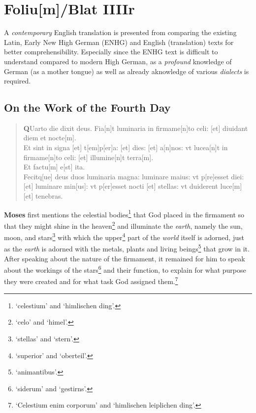 \documentclass[
]{article}
\author{Dietmar Gerald Schrausser}
\date{09.05.2026}
\begin{document}
\hypertarget{foliumblat-iiiir}{%
\section{Foliu{[}m{]}/Blat IIIIr}\label{foliumblat-iiiir}}

A \emph{contemporary} English translation is presented from comparing
the existing Latin, Early New High German (ENHG) and English
(translation) texts for better comprehensibility. Especially since the
ENHG text is difficult to understand compared to modern High German, as
a \emph{profound} knowledge of German (as a mother tongue) as well as
already aknowledge of various \emph{dialects} is required.

\hypertarget{on-the-work-of-the-fourth-day}{%
\subsection{On the Work of the Fourth
Day}\label{on-the-work-of-the-fourth-day}}

\begin{quote}
\textbf{Q}Uarto die dixit deus. Fia{[}n{]}t luminaria in
firmame{[}n{]}to celi: {[}et{]} diuidant diem et nocte{[}m{]}.\\
Et sint in signa {[}et{]} t{[}em{]}p{[}er{]}a: {[}et{]} dies: {[}et{]}
a{[}n{]}nos: vt lucea{[}n{]}t in firmame{[}n{]}to celi: {[}et{]}
illumine{[}n{]}t terra{[}m{]}.\\
Et factu{[}m{]} e{[}st{]} ita.\\
Fecitq{[}ue{]} deus duos luminaria magna: luminare maius: vt
p{[}re{]}esset diei: {[}et{]} luminare min{[}us{]}: vt p{[}er{]}esset
nocti {[}et{]} stellas: vt duiderent luce{[}m{]} {[}et{]} tenebras.
\end{quote}

\textbf{Moses} first mentions the celestial bodies\footnote{`celestium'
  and `himlischen ding'.} that God placed in the firmament so that they
might shine in the heaven\footnote{`celo' and `himel'.} and illuminate
the \emph{earth}, namely the sun, moon, and stars\footnote{`stellas' and
  `stern'.} with which the upper\footnote{`superior' and `oberteil'.}
part of the \emph{world} itself is adorned, just as the \emph{earth} is
adorned with the metals, plants and living beings\footnote{`animantibus'.}
that grow in it. After speaking about the nature of the firmament, it
remained for him to speak about the workings of the stars\footnote{`siderum'
  and `gestirns'.} and their function, to explain for what purpose they
were created and for what task God assigned them.\footnote{`Celestium
  enim corporum' and `himlischen leiplichen ding'.}
\end{document}

